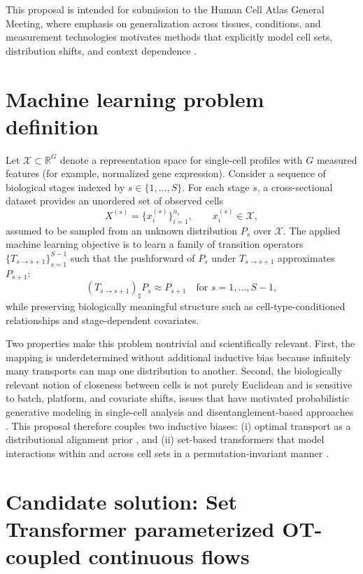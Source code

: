 \documentclass[conference]{IEEEtran}
\newcommand{\R}{\mathbb{R}}
\newcommand{\pushfwd}{\sharp} %
\begin{document}
This proposal is intended for submission to the Human Cell Atlas General Meeting, where emphasis on generalization across tissues, conditions, and measurement technologies motivates methods that explicitly model cell sets, distribution shifts, and context dependence \cite{Tejada-Lapuerta2025-wz,Dong2026-fb,Adduri2025-nt}.

\section{Machine learning problem definition}

Let $\mathcal{X} \subset \R^G$ denote a representation space for single-cell profiles with $G$ measured features (for example, normalized gene expression). Consider a sequence of biological stages indexed by $s \in \{1,\dots,S\}$. For each stage $s$, a cross-sectional dataset provides an unordered set of observed cells
\[
X^{(s)} = \{x^{(s)}_i\}_{i=1}^{n_s}, \qquad x^{(s)}_i \in \mathcal{X},
\]
assumed to be sampled from an unknown distribution $P_s$ over $\mathcal{X}$. The applied machine learning objective is to learn a family of transition operators $\{T_{s \rightarrow s+1}\}_{s=1}^{S-1}$ such that the pushforward of $P_s$ under $T_{s \rightarrow s+1}$ approximates $P_{s+1}$:
\[
(T_{s \rightarrow s+1})_{\pushfwd} P_s \approx P_{s+1} \quad \text{for } s=1,\dots,S-1,
\]
while preserving biologically meaningful structure such as cell-type-conditioned relationships and stage-dependent covariates.

Two properties make this problem nontrivial and scientifically relevant. First, the mapping is underdetermined without additional inductive bias because infinitely many transports can map one distribution to another. Second, the biologically relevant notion of closeness between cells is not purely Euclidean and is sensitive to batch, platform, and covariate shifts, issues that have motivated probabilistic generative modeling in single-cell analysis \cite{Lopez2018-ns} and disentanglement-based approaches \cite{Piran2024-ca}. This proposal therefore couples two inductive biases: (i) optimal transport as a distributional alignment prior \cite{Bunne2024-pl,Cuturi2013-li}, and (ii) set-based transformers that model interactions within and across cell sets in a permutation-invariant manner \cite{Lee2018-ya}.

\section{Candidate solution: Set Transformer parameterized OT-coupled continuous flows}
\end{document}
